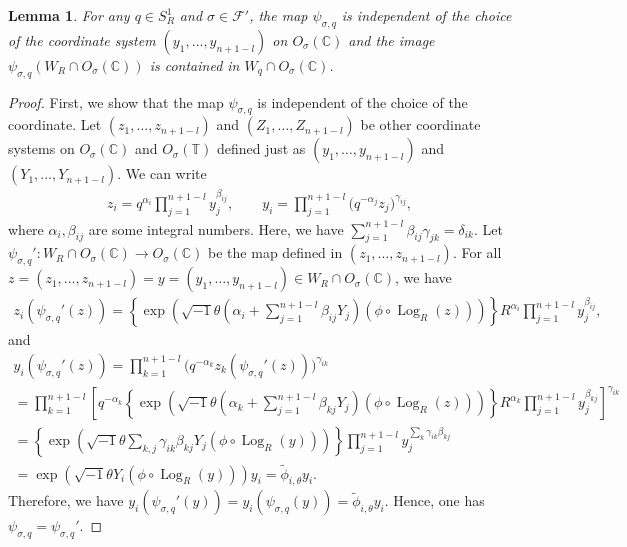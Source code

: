 \documentclass[10pt,a4paper]{amsart}
\numberwithin{equation}{section}
\newtheorem{Lemma}[Theorem]{Lemma}
\begin{document}
\begin{Lemma}\label{lm:c0}
For any $q \in S_R^1$ and $\sigma \in {\mathcal F}'$, the map $\psi_{\sigma,q}$ is independent of the choice of the coordinate system $(y_1, \dots, y_{n+1-l})$ on $O_\sigma({\mathbb C})$ and the image $\psi_{\sigma,q}(W_R \cap O_\sigma({\mathbb C}))$ is contained in $W_q \cap O_\sigma({\mathbb C})$.
\end{Lemma}
\begin{proof}
First, we show that the map $\psi_{\sigma,q}$ is independent of the choice of the coordinate. Let $(z_1, \dots, z_{n+1-l})$ and $(Z_1, \dots, Z_{n+1-l})$ be other coordinate systems on $O_\sigma({\mathbb C})$ and $O_\sigma({\mathbb T})$ def\/ined just as $(y_1, \dots, y_{n+1-l})$ and $(Y_1, \dots, Y_{n+1-l})$.
We can write
\begin{gather*}
z_i=q^{\alpha_i}\prod_{j=1}^{n+1-l}y_j^{\beta_{ij}}, \qquad y_i=\prod_{j=1}^{n+1-l}\big(q^{-\alpha_j}z_j\big)^{\gamma_{ij}},
\end{gather*}
where $\alpha_i, \beta_{ij}$ are some integral numbers. Here, we have $\sum\limits_{j=1}^{n+1-l}\beta_{ij}\gamma_{jk}=\delta_{ik}$. Let $\psi_{\sigma,q}' \colon W_R \cap O_\sigma({\mathbb C}) \to O_\sigma({\mathbb C})$ be the map def\/ined in $(z_1, \dots, z_{n+1-l})$. For all $z=(z_1, \dots, z_{n+1-l})=y=(y_1, \dots, y_{n+1-l}) \in W_R \cap O_\sigma({\mathbb C})$, we have
\begin{gather*}
z_i \left( \psi_{\sigma,q}' (z) \right)= \left\{ \exp \left( \sqrt{-1} \theta \left( \alpha_i+\sum_{j=1}^{n+1-l} \beta_{ij} Y_j \right) \left( \phi \circ \operatorname{Log}_R (z)\right) \right) \right\} R^{\alpha_i} \prod_{j=1}^{n+1-l} y_j^{\beta_{ij}},
\end{gather*}
and
\begin{gather*}
y_i \left( \psi_{\sigma,q}'(z) \right) =\prod_{k=1}^{n+1-l} \big( q^{-\alpha_k} z_k (\psi_{\sigma,q}' (z)) \big)^{\gamma_{ik}} \\
 =\prod_{k=1}^{n+1-l} \left[ q^{-\alpha_k} \left\{ \exp \left( \sqrt{-1} \theta \left( \alpha_k+\sum_{j=1}^{n+1-l} \beta_{kj} Y_j \right) \left( \phi \circ \operatorname{Log}_R (z)\right) \right) \right\} R^{\alpha_k} \prod_{j=1}^{n+1-l} y_j^{\beta_{kj}} \right]^{\gamma_{ik}} \\
 =\left\{ \exp \left(\sqrt{-1} \theta \sum_{k,j} \gamma_{ik} \beta_{kj} Y_j \left(\phi \circ \operatorname{Log}_R (y) \right) \right) \right\} \prod_{j=1}^{n+1-l} y_j^{\sum_{k} \gamma_{ik} \beta_{kj}} \\
 =\exp \left( \sqrt{-1} \theta Y_i \left( \phi \circ \operatorname{Log}_R (y) \right) \right) y_i = \tilde{\phi}_{i,\theta} y_i.
\end{gather*}
Therefore, we have $y_i ( \psi_{\sigma,q}'(y) )=y_i (\psi_{\sigma,q}(y) )=\tilde{\phi}_{i,\theta} y_i$. Hence, one has $\psi_{\sigma,q} = \psi_{\sigma,q}'$.


\end{proof}
\end{document}
